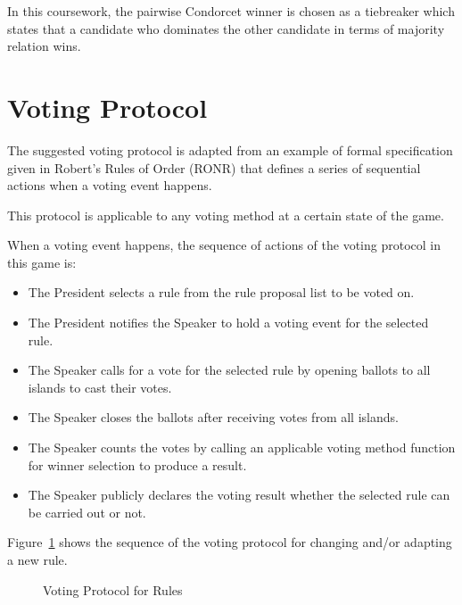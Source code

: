 In this coursework, the pairwise Condorcet winner is chosen as a tiebreaker which states that a candidate who dominates the other candidate in terms of majority relation wins.

\section{Voting Protocol}
\label{sec:VotingProtocol}
The suggested voting protocol is adapted from an example of formal specification given in Robert's Rules of Order (RONR) that defines a series of sequential actions when a voting event happens.

This protocol is applicable to any voting method at a certain state of the game.

When a voting event happens, the sequence of actions of the voting protocol in this game is:
\begin{itemize}
    \item The President selects a rule from the rule proposal list to be voted on.
    \item The President notifies the Speaker to hold a voting event for the selected rule.
    \item The Speaker calls for a vote for the selected rule by opening ballots to all islands to cast their votes.
    \item The Speaker closes the ballots after receiving votes from all islands.
    \item The Speaker counts the votes by calling an applicable voting method function for winner selection to produce a result.
    \item The Speaker publicly declares the voting result whether the selected rule can be carried out or not.
\end{itemize}

Figure~\ref{fig:RONRVotingProtocol} shows the sequence of the voting protocol for changing and/or adapting a new rule.

\begin{figure}[!htb]
\begin{center}
\caption{Voting Protocol for Rules}
\label{fig:RONRVotingProtocol}
\end{center}
\end{figure}

